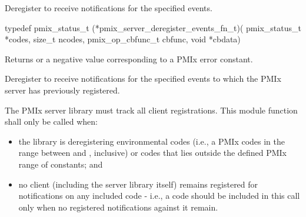 Deregister to receive notifications for the specified events.

\format

\cspecificstart
\begin{codepar}
 typedef pmix_status_t (*pmix_server_deregister_events_fn_t)(
                              pmix_status_t *codes,
                              size_t ncodes,
                              pmix_op_cbfunc_t cbfunc,
                              void *cbdata)
\end{codepar}
\cspecificend

\begin{arglist}
\end{arglist}

Returns  or a negative value corresponding to a PMIx error constant.

\descr

Deregister to receive notifications for the specified events to which the \ac{PMIx} server has previously registered.

\adviceimplstart
The \ac{PMIx} server library must track all client registrations. This module function shall only be called when:

\begin{itemize}
    \item the library is deregistering environmental codes (i.e., a \ac{PMIx} codes in the range between  and , inclusive) or codes that lies outside the defined \ac{PMIx} range of constants; and
    \item no client (including the server library itself) remains registered for notifications on any included code - i.e., a code should be included in this call only when no registered notifications against it remain.
\end{itemize}

\adviceimplend


\subsection{}

